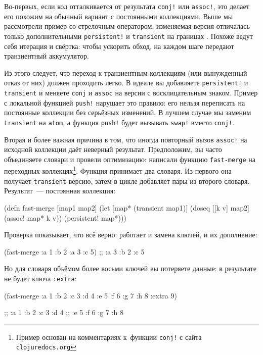 Во-первых, если код отталкивается от результата \verb|conj!| или \verb|assoc!|,
это делает его похожим на обычный вариант с постоянными коллекциями. Выше мы
рассмотрели пример со стрелочным оператором: изменяемая версия отличалась только
дополнительными \verb|persistent!| и \verb|transient| на
границах . Похоже ведут себя итерация и свёртка: чтобы
ускорить обход, на каждом шаге передают транзиентный аккумулятор.

Из этого следует, что переход к транзиентным коллекциям (или вынужденный отказ
от них) должен проходить легко. В идеале вы добавляете \verb|persistent!| и
\verb|transient| и меняете \verb|conj| и \verb|assoc| на версии с
восклицательным знаком. Пример с локальной функцией \verb|push!| нарушает это
правило: его нельзя переписать на постоянные коллекции без серьёзных
изменений. В лучшем случае мы заменим \verb|transient| на \verb|atom|, а функция
\verb|push!| будет вызывать \verb|swap!| вместо \verb|conj!|.

Вторая и более важная причина в том, что иногда повторный вызов \verb|assoc!| на
исходной коллекции даёт неверный результат. Предположим, вы часто объединяете
словари и провели оптимизацию: написали функцию \verb|fast-merge| на переходных
коллекцях\footnote{Пример основан на комментариях к~функции \texttt{conj!} с
  сайта \texttt{clo\-ju\-re\-docs.org}}. Функция принимает два словаря. Из
первого она получает \verb|transient|-версию, затем в цикле добавляет пары из
второго словаря. Результат~--- постоянная коллекция:

\begin{english}
  \begin{clojure}
(defn fast-merge [map1 map2]
  (let [map* (transient map1)]
    (doseq [[k v] map2]
      (assoc! map* k v))
    (persistent! map*)))
  \end{clojure}
\end{english}

Проверка показывает, что всё верно: работает и замена ключей, и их дополнение:

\begin{english}
  \begin{clojure}
(fast-merge {:a 1 :b 2} {:a 3 :c 5})
;; {:a 3 :b 2 :c 5}
  \end{clojure}
\end{english}

Но для словаря объёмом более восьми ключей вы потеряете данные: в результате не
будет ключа \verb|:extra|:

\begin{english}
  \begin{clojure}
(fast-merge
 {:a 1 :b 2 :c 3 :d 4 :e 5 :f 6 :g 7 :h 8}
 {:extra 9})

;; {:a 1 :b 2 :c 3 :d 4
;;  :e 5 :f 6 :g 7 :h 8}
  \end{clojure}
\end{english}

